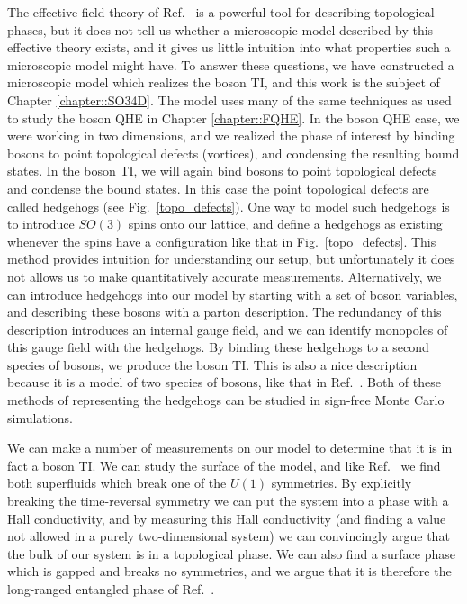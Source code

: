The effective field theory of Ref.~\cite{SenthilVishwanath} is a powerful tool for describing topological phases, but it does not tell us whether a microscopic model described by this effective theory exists, and it gives us little intuition into what properties such a microscopic model might have. To answer these questions, we have constructed a microscopic model which realizes the boson TI, and this work is the subject of Chapter \ref{chapter::SO34D}.
The model uses many of the same techniques as used to study the boson QHE in Chapter \ref{chapter::FQHE}. In the boson QHE case, we were working in two dimensions, and we realized the phase of interest by binding bosons to point topological defects (vortices), and condensing the resulting bound states. In the boson TI, we will again bind bosons to point topological defects and condense the bound states. In this case the point topological defects are called hedgehogs (see Fig.~\ref{topo_defects}). One way to model such hedgehogs is to introduce $SO(3)$ spins onto our lattice, and define a hedgehogs as existing whenever the spins have a configuration like that in Fig.~\ref{topo_defects}. This method provides intuition for understanding our setup, but unfortunately it does not allows us to make quantitatively accurate measurements. Alternatively, we can introduce hedgehogs into our model by starting with a set of boson variables, and describing these bosons with a parton description. The redundancy of this description introduces an internal gauge field, and we can identify monopoles of this gauge field with the hedgehogs. By binding these hedgehogs to a second species of bosons, we produce the boson TI. This is also a nice description because it is a model of two species of bosons, like that in Ref.~\cite{SenthilVishwanath}. Both of these methods of representing the hedgehogs can be studied in sign-free Monte Carlo simulations.

We can make a number of measurements on our model to determine that it is in fact a boson TI. We can study the surface of the model, and like Ref.~\cite{SenthilVishwanath} we find both superfluids which break one of the $U(1)$ symmetries. By explicitly breaking the time-reversal symmetry we can put the system into a phase with a Hall conductivity, and by measuring this Hall conductivity (and finding a value not allowed in a purely two-dimensional system) we can convincingly argue that the bulk of our system is in a topological phase. We can also find a surface phase which is gapped and breaks no symmetries, and we argue that it is therefore the long-ranged entangled phase of Ref.~\cite{SenthilVishwanath}.

